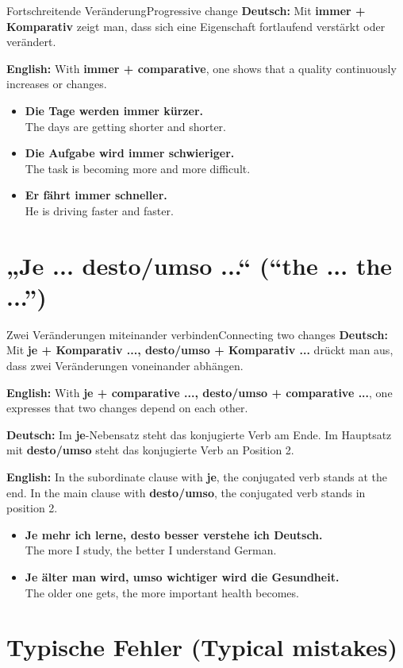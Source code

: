 \documentclass[a4paper,11pt]{article}
\newcommand{\GermanText}[1]{\textbf{Deutsch: }#1\par}
\newcommand{\EnglishText}[1]{{\small\color{SoftGray}\textbf{English: }#1\par}}
\newcommand{\ExampleItem}[2]{\item \textbf{#1}\\{\small\color{SoftGray}#2}}
\begin{document}
\begin{grammarentry}{Fortschreitende Veränderung}{Progressive change}
\GermanText{Mit \textbf{immer + Komparativ} zeigt man, dass sich eine Eigenschaft fortlaufend verstärkt oder verändert.}
\EnglishText{With \textbf{immer + comparative}, one shows that a quality continuously increases or changes.}
\end{grammarentry}

\begin{exbox}
\begin{itemize}
\ExampleItem{Die Tage werden immer kürzer.}{The days are getting shorter and shorter.}
\ExampleItem{Die Aufgabe wird immer schwieriger.}{The task is becoming more and more difficult.}
\ExampleItem{Er fährt immer schneller.}{He is driving faster and faster.}
\end{itemize}
\end{exbox}

\section{„Je ... desto/umso ...“ \textnormal{(“the ... the ...”)}}

\begin{grammarentry}{Zwei Veränderungen miteinander verbinden}{Connecting two changes}
\GermanText{Mit \textbf{je + Komparativ ..., desto/umso + Komparativ ...} drückt man aus, dass zwei Veränderungen voneinander abhängen.}
\EnglishText{With \textbf{je + comparative ..., desto/umso + comparative ...}, one expresses that two changes depend on each other.}

\GermanText{Im \textbf{je}-Nebensatz steht das konjugierte Verb am Ende. Im Hauptsatz mit \textbf{desto/umso} steht das konjugierte Verb an Position 2.}
\EnglishText{In the subordinate clause with \textbf{je}, the conjugated verb stands at the end. In the main clause with \textbf{desto/umso}, the conjugated verb stands in position 2.}
\end{grammarentry}

\begin{exbox}
\begin{itemize}
\ExampleItem{Je mehr ich lerne, desto besser verstehe ich Deutsch.}{The more I study, the better I understand German.}
\ExampleItem{Je älter man wird, umso wichtiger wird die Gesundheit.}{The older one gets, the more important health becomes.}
\end{itemize}
\end{exbox}

\section{Typische Fehler \textnormal{(Typical mistakes)}}
\end{document}
